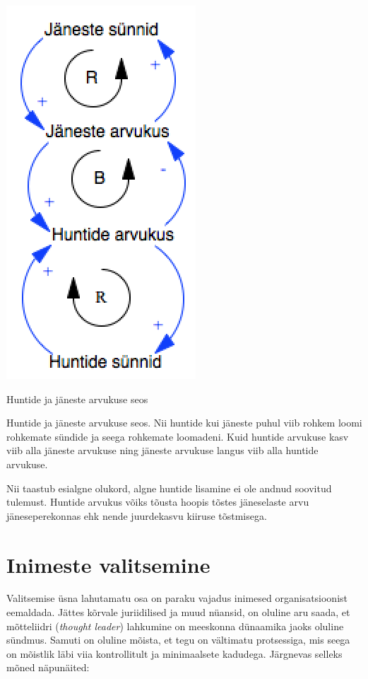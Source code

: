 \documentclass{tufte-book}
\begin{document}
\begin{marginfigure}
		\begin{center}
		\includegraphics[width=.7\linewidth]{hundid.png}
		\caption{Huntide ja jäneste arvukuse seos}
		\label{fig:wolves}
		\end{center}
	Huntide ja jäneste arvukuse seos. Nii huntide kui jäneste puhul viib rohkem loomi rohkemate sündide ja seega rohkemate loomadeni. Kuid huntide arvukuse kasv viib alla jäneste arvukuse ning jäneste arvukuse langus viib alla huntide arvukuse.
\end{marginfigure}

Nii taastub esialgne olukord, algne huntide lisamine ei ole andnud soovitud tulemust. Huntide arvukus võiks tõusta hoopis tõstes jäneselaste arvu jäneseperekonnas ehk nende juurdekasvu kiiruse tõstmisega. 

\section{Inimeste valitsemine}
Valitsemise üsna lahutamatu osa on paraku vajadus inimesed organisatsioonist eemaldada. Jättes kõrvale juriidilised ja muud nüansid, on oluline aru saada, et mõtteliidri (\emph{thought leader}) lahkumine on meeskonna dünaamika jaoks oluline sündmus. Samuti on oluline mõista, et tegu on vältimatu protsessiga, mis seega on mõistlik läbi viia kontrollitult ja minimaalsete kadudega. Järgnevas selleks mõned näpunäited: 
\end{document}
